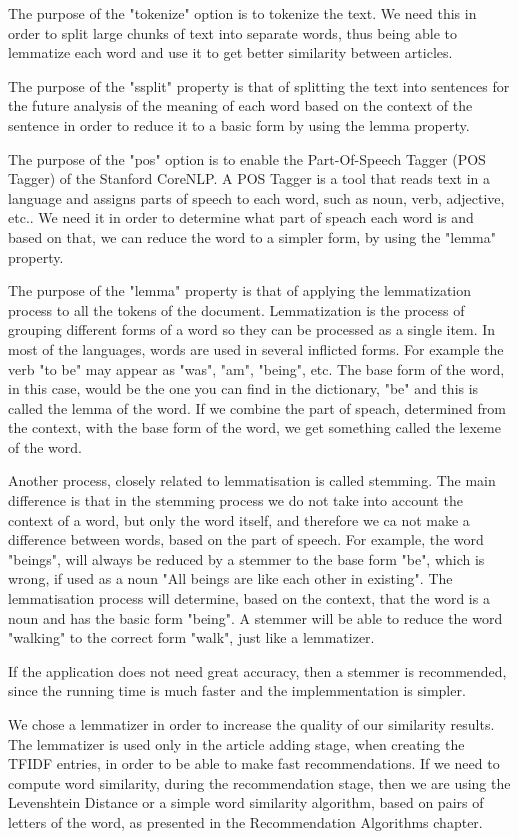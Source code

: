 The purpose of the "tokenize" option is to tokenize the text. We need this in order to split large chunks of text into separate words, thus being able to lemmatize each word and use it to get better similarity between articles.

The purpose of the "ssplit" property is that of splitting the text into sentences for the future analysis of the meaning of each word based on the context of the sentence in order to reduce it to a basic form by using the lemma property.

The purpose of the "pos" option is to enable the Part-Of-Speech Tagger (POS Tagger) of the Stanford CoreNLP. 
A POS Tagger is a tool that reads text in a language and assigns parts of speech to each word, such as noun, verb, adjective, etc..
We need it in order to determine what part of speach each word is and based on that, we can reduce the word to a simpler form, by using the "lemma" property.

The purpose of the "lemma" property is that of applying the lemmatization process to all the tokens of the document.
Lemmatization is the process of grouping different forms of a word so they can be processed as a single item.
In most of the languages, words are used in several inflicted forms. For example the verb "to be" may appear as "was", "am", "being", etc. The base form of the word, in this case, would be the one you can find in the dictionary, "be" and this is called the lemma of the word. If we combine the part of speach, determined from the context,  with the base form of the word, we get something called the lexeme of the word. 

Another process, closely related to lemmatisation is called stemming. The main difference is that in the stemming process we do not take into account the context of a word, but only the word itself, and therefore we ca not make a difference between words, based on the part of speech. For example, the word "beings", will always be reduced by a stemmer to the base form "be", which is wrong, if used as a noun "All beings are like each other in existing". The lemmatisation process will determine, based on the context, that the word is a noun and has the basic form "being". A stemmer will be able to reduce the word "walking" to the correct form "walk", just like a lemmatizer.

If the application does not need great accuracy, then a stemmer is recommended, since the running time is much faster and the implemmentation is simpler.

We chose a lemmatizer in order to increase the quality of our similarity results. The lemmatizer is used only in the article adding stage, when creating the TFIDF entries, in order to be able to make fast recommendations. If we need to compute word similarity, during the recommendation stage, then we are using the Levenshtein Distance or a simple word similarity algorithm, based on pairs of letters of the word, as presented in the Recommendation Algorithms chapter.

